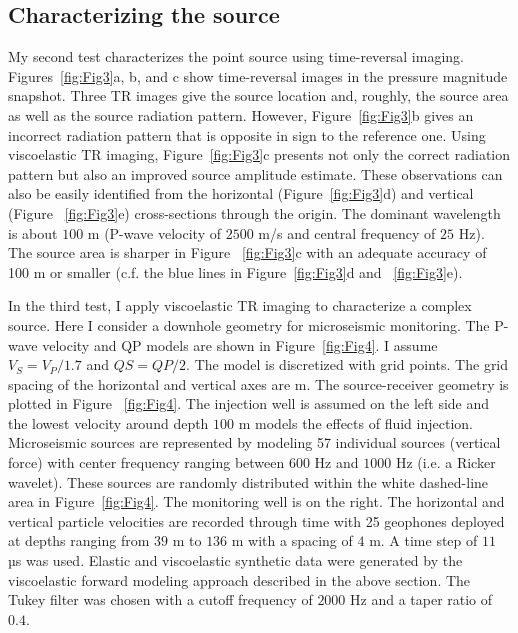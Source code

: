 \subsection{Characterizing the source} 
My second test characterizes the point source using time-reversal imaging. Figures~\ref{fig:Fig3}a, b, and c show time-reversal images in the pressure magnitude snapshot.  Three TR images give the source location and, roughly, the source area as well as the source radiation pattern. However, Figure~\ref{fig:Fig3}b gives an incorrect radiation pattern that is opposite in sign to the reference one. Using viscoelastic TR imaging, Figure~\ref{fig:Fig3}c presents not only the correct radiation pattern but also an improved source amplitude estimate. These observations can also be easily identified from the horizontal (Figure~\ref{fig:Fig3}d) and vertical (Figure ~\ref{fig:Fig3}e) cross-sections through the origin. The dominant wavelength is about $100$ m (P-wave velocity of $2500$ m/s and central frequency of $25$ Hz). The source area is sharper in Figure ~\ref{fig:Fig3}c with an adequate accuracy of 100 m or smaller (c.f. the blue lines in Figure~\ref{fig:Fig3}d and ~\ref{fig:Fig3}e). 

In the third test, I apply viscoelastic TR imaging to characterize a complex source. Here I consider a downhole geometry for microseismic monitoring. The P-wave velocity and QP models are shown in Figure~\ref{fig:Fig4}. I assume $V_S = V_P/1.7$ and $QS = QP/2$. The model is discretized with   grid points. The grid spacing of the horizontal and vertical axes are  m. The source-receiver geometry is plotted in Figure ~\ref{fig:Fig4}. The injection well is assumed on the left side and the lowest velocity around depth $100$ m models the effects of fluid injection. Microseismic sources are represented by modeling 57 individual sources (vertical force) with center frequency ranging between $600$ Hz and $1000$ Hz (i.e. a Ricker wavelet). These sources are randomly distributed within the white dashed-line area in Figure~\ref{fig:Fig4}. The monitoring well is on the right. The horizontal and vertical particle velocities are recorded through time with 25 geophones deployed at depths ranging from $39$ m to $136$ m with a spacing of $4$ m.  A time step of $11$ µs was used. Elastic and viscoelastic synthetic data were generated by the viscoelastic forward modeling approach described in the above section. The Tukey filter was chosen with a cutoff frequency of $2000$ Hz and a taper ratio of $0.4$.



